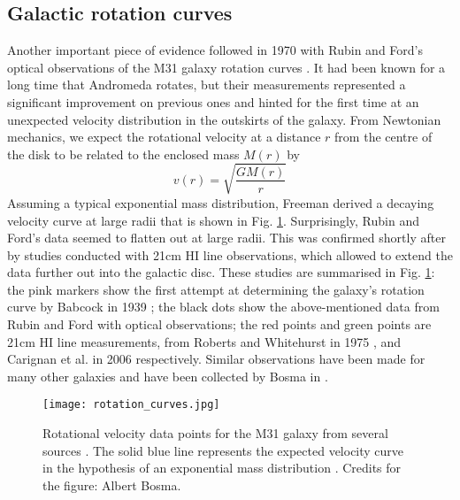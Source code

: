 \subsection{Galactic rotation curves}\label{sec:rotation_curves}
Another important piece of evidence followed in 1970 with Rubin and Ford's optical observations of the M31 galaxy rotation curves \cite{Rubin_1970}. It had been known for a long time that Andromeda rotates, but their measurements represented a significant improvement on previous ones and hinted for the first time at an unexpected velocity distribution in the outskirts of the galaxy. From Newtonian mechanics, we expect the rotational velocity at a distance \(r\) from the centre of the disk to be related to the enclosed mass \(M(r)\) by \cite{Lisanti_2018}
\begin{equation}\label{eq:rotational_velocity}
	v(r)=\sqrt{\frac{GM(r)}{r}} 
\end{equation}
Assuming a typical exponential mass distribution, Freeman \cite{Freeman_1970} derived a decaying velocity curve at large radii that is shown in Fig. \ref{fig:rotation_curves}. Surprisingly, Rubin and Ford's data seemed to flatten out at large radii. This was confirmed shortly after by studies conducted with 21cm HI line observations, which allowed to extend the data further out into the galactic disc. These studies are summarised in Fig. \ref{fig:rotation_curves}: the pink markers show the first attempt at determining the galaxy's rotation curve by Babcock in 1939 \cite{Babcock_1939}; the black dots show the above-mentioned data from Rubin and Ford with optical observations; the red points and green points are 21cm HI line measurements, from Roberts and Whitehurst in 1975 \cite{Roberts_1975}, and Carignan et al. in 2006 \cite{Carignan_2006} respectively. Similar observations have been made for many other galaxies and have been collected by Bosma in \cite{Bosma_1981}.
\begin{figure}[!ht]
	\centering
	\texttt{[image: rotation\_curves.jpg]}
	\caption{Rotational velocity data points for the M31 galaxy from several sources \cite{Babcock_1939, Rubin_1970, Roberts_1975, Carignan_2006}. The solid blue line represents the expected velocity curve in the hypothesis of an exponential mass distribution \cite{Freeman_1970}. Credits for the figure: Albert Bosma.}
	\label{fig:rotation_curves}
\end{figure}

